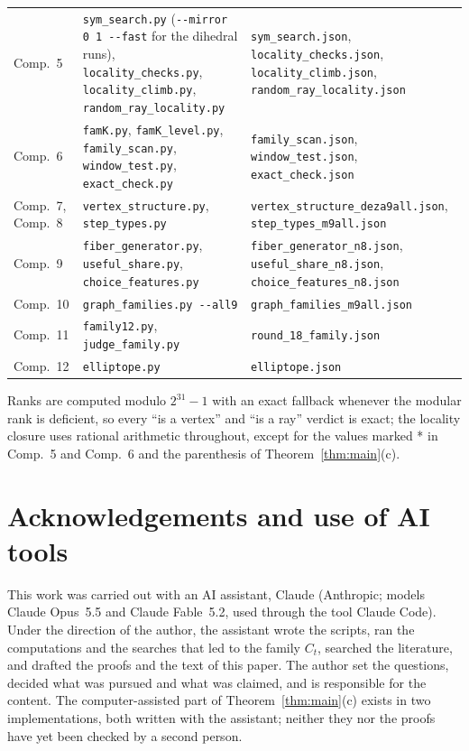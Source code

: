 \documentclass[11pt,a4paper]{article}
\theoremstyle{definition}
\theoremstyle{remark}
\newcommand{\file}[1]{\texttt{#1}}
\begin{document}
{\begin{center}
\begin{tabular}{@{}>{\raggedright\arraybackslash}p{}>{\raggedright\arraybackslash}p{}>{\raggedright\arraybackslash}p{}@{}}
Comp.~5 & \file{sym\_search.py} (\file{-{}-mirror 0 1 -{}-fast} for the dihedral runs), \file{locality\_checks.py},
  \file{locality\_climb.py}, \file{random\_ray\_locality.py} &
  \file{sym\_search.json}, \file{locality\_checks.json}, \file{locality\_climb.json},
  \file{random\_ray\_locality.json} \\
Comp.~6 & \file{famK.py}, \file{famK\_level.py}, \file{family\_scan.py}, \file{window\_test.py}, \file{exact\_check.py} &
  \file{family\_scan.json}, \file{window\_test.json}, \file{exact\_check.json} \\
Comp.~7, Comp.~8 & \file{vertex\_structure.py}, \file{step\_types.py} &
  \file{vertex\_structure\_deza9all.json}, \file{step\_types\_m9all.json} \\
Comp.~9 & \file{fiber\_generator.py}, \file{useful\_share.py}, \file{choice\_features.py} &
  \file{fiber\_generator\_n8.json}, \file{useful\_share\_n8.json}, \file{choice\_features\_n8.json} \\
Comp.~10 & \file{graph\_families.py -{}-all9} & \file{graph\_families\_m9all.json} \\
Comp.~11 & \file{family12.py}, \file{judge\_family.py} & \file{round\_18\_family.json} \\
Comp.~12 & \file{elliptope.py} & \file{elliptope.json} \\
\bottomrule
\end{tabular}
\end{center}
}

Ranks are computed modulo $2^{31} - 1$ with an exact fallback whenever the modular rank is deficient, so every ``is
a vertex'' and ``is a ray'' verdict is exact; the locality closure uses rational arithmetic throughout, except for
the values marked * in Comp.~5 and Comp.~6 and the parenthesis of Theorem~\ref{thm:main}(c).

\section*{Acknowledgements and use of AI tools}

This work was carried out with an AI assistant, Claude (Anthropic; models Claude Opus~5.5 and Claude Fable~5.2, used
through the tool Claude Code). Under the direction of the author, the assistant wrote the scripts, ran the
computations and the searches that led to the family $C_t$, searched the literature, and drafted the proofs and the
text of this paper. The author set the questions, decided what was pursued and what was claimed, and is responsible
for the content. The computer-assisted part of Theorem~\ref{thm:main}(c) exists in two implementations, both written
with the assistant; neither they nor the proofs have yet been checked by a second person.
\end{document}
